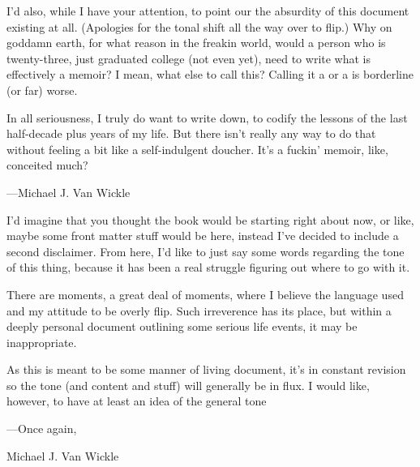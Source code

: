 {I'd also, while I have your attention, to point our the absurdity of this document existing at all.
(Apologies for the tonal shift all the way over to flip.)
Why on goddamn earth, for what reason in the freakin world, would a person who is twenty-three, just graduated college (not even yet), need to write what is effectively a memoir?
I mean, what else to call this?
Calling it a  or a  is borderline (or far) worse.

In all seriousness, I truly do want to write down, to codify the lessons of the last half-decade plus years of my life.
But there isn't really any way to do that without feeling a bit like a self-indulgent doucher.
It's a fuckin' memoir, like, conceited much?}

\noindent\hspace*{2em} ---Michael J. Van Wickle
\vspace*{\fill}
\newpage

\setcounter{footnote}{0}
{\normalsize I'd imagine that you thought the book would be starting right about now, or like, maybe some front matter stuff would be here, instead I've decided to include a second disclaimer.
From here, I'd like to just say some words regarding the tone of this thing, because it has been a real struggle figuring out where to go with it.

There are moments, a great deal of moments, where I believe the language used and my attitude to be overly flip.
Such irreverence has its place, but within a deeply personal document outlining some serious life events, it may be inappropriate.

As this is meant to be some manner of living document, it's in constant revision so the tone (and content and stuff) will generally be in flux.
I would like, however, to have at least an idea of the general tone\lips}

\noindent\hspace*{2em} ---Once again,

\noindent\hspace*{2em} Michael J. Van Wickle
\vspace*{\fill}

